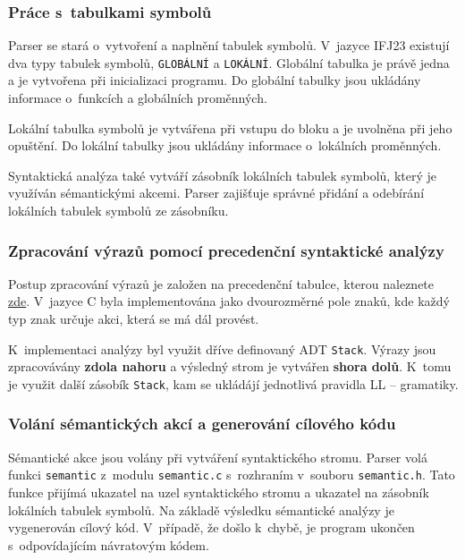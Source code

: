 \documentclass[a4paper, 11pt]{article}
\begin{document}
	\subsubsection{Práce s~tabulkami symbolů}
	Parser se stará o~vytvoření a naplnění tabulek symbolů. V~jazyce IFJ23 existují dva typy tabulek symbolů, \texttt{GLOBÁLNÍ} a \texttt{LOKÁLNÍ}.
	Globální tabulka je právě jedna a je vytvořena při inicializaci programu. Do globální tabulky jsou ukládány informace o~funkcích a globálních proměnných.
	\par\noindent Lokální tabulka symbolů je vytvářena při vstupu do bloku a je uvolněna při jeho opuštění. Do lokální tabulky jsou ukládány informace o~lokálních proměnných.
	\par\noindent Syntaktická analýza také vytváří zásobník lokálních tabulek symbolů, který je využíván sémantickými akcemi. Parser zajišťuje správné přidání a odebírání lokálních tabulek symbolů ze zásobníku. 

	\subsubsection{Zpracování výrazů pomocí precedenční syntaktické analýzy}
	\label{sec:precedence}
	Postup zpracování výrazů je založen na precedenční tabulce, kterou naleznete \hyperref[sec:precedence_table]{zde}. V~jazyce C byla implementována jako dvourozměrné pole znaků, kde každý typ znak určuje akci, která se má dál provést. 
	\par\noindent K~implementaci analýzy byl využit dříve definovaný ADT \texttt{Stack}. Výrazy jsou zpracovávány \textbf{zdola nahoru} a výsledný strom je vytvářen \textbf{shora dolů}. K~tomu je využit další zásobík \texttt{Stack}, kam se ukládájí jednotlivá pravidla LL -- gramatiky.


	\subsubsection{Volání sémantických akcí a generování cílového kódu}
	\label{sec:sem}
	Sémantické akce jsou volány při vytváření syntaktického stromu. Parser volá funkci \texttt{semantic} z~modulu \texttt{semantic.c} s~rozhraním v~souboru \texttt{semantic.h}. Tato funkce přijímá ukazatel na uzel syntaktického stromu a ukazatel na zásobník lokálních tabulek symbolů.
	Na základě výsledku sémantické analýzy je vygenerován cílový kód. V~případě, že došlo k~chybě, je program ukončen s~odpovídajícím návratovým kódem.
\end{document}

